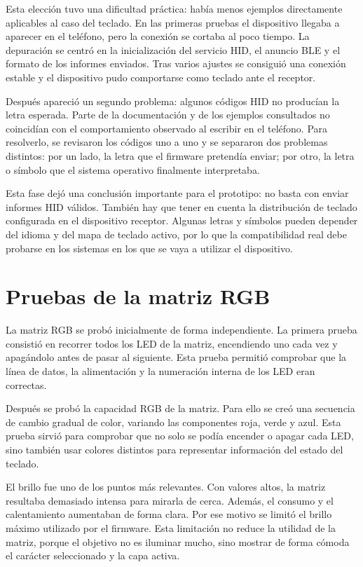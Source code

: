 Esta elección tuvo una dificultad práctica: había menos ejemplos directamente aplicables al caso del teclado. En las primeras pruebas el dispositivo llegaba a aparecer en el teléfono, pero la conexión se cortaba al poco tiempo. La depuración se centró en la inicialización del servicio HID, el anuncio BLE y el formato de los informes enviados. Tras varios ajustes se consiguió una conexión estable y el dispositivo pudo comportarse como teclado ante el receptor.

Después apareció un segundo problema: algunos códigos HID no producían la letra esperada. Parte de la documentación y de los ejemplos consultados no coincidían con el comportamiento observado al escribir en el teléfono. Para resolverlo, se revisaron los códigos uno a uno y se separaron dos problemas distintos: por un lado, la letra que el firmware pretendía enviar; por otro, la letra o símbolo que el sistema operativo finalmente interpretaba.

Esta fase dejó una conclusión importante para el prototipo: no basta con enviar informes HID válidos. También hay que tener en cuenta la distribución de teclado configurada en el dispositivo receptor. Algunas letras y símbolos pueden depender del idioma y del mapa de teclado activo, por lo que la compatibilidad real debe probarse en los sistemas en los que se vaya a utilizar el dispositivo.

\section{Pruebas de la matriz RGB}
\label{sec:pruebas-matriz-rgb}

La matriz RGB se probó inicialmente de forma independiente. La primera prueba consistió en recorrer todos los LED de la matriz, encendiendo uno cada vez y apagándolo antes de pasar al siguiente. Esta prueba permitió comprobar que la línea de datos, la alimentación y la numeración interna de los LED eran correctas.

Después se probó la capacidad RGB de la matriz. Para ello se creó una secuencia de cambio gradual de color, variando las componentes roja, verde y azul. Esta prueba sirvió para comprobar que no solo se podía encender o apagar cada LED, sino también usar colores distintos para representar información del estado del teclado.

El brillo fue uno de los puntos más relevantes. Con valores altos, la matriz resultaba demasiado intensa para mirarla de cerca. Además, el consumo y el calentamiento aumentaban de forma clara. Por ese motivo se limitó el brillo máximo utilizado por el firmware. Esta limitación no reduce la utilidad de la matriz, porque el objetivo no es iluminar mucho, sino mostrar de forma cómoda el carácter seleccionado y la capa activa.

